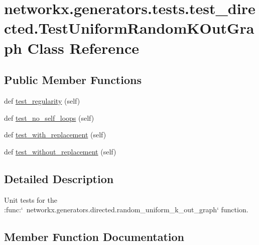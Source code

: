 \hypertarget{classnetworkx_1_1generators_1_1tests_1_1test__directed_1_1TestUniformRandomKOutGraph}{}\section{networkx.\+generators.\+tests.\+test\+\_\+directed.\+Test\+Uniform\+Random\+K\+Out\+Graph Class Reference}
\label{classnetworkx_1_1generators_1_1tests_1_1test__directed_1_1TestUniformRandomKOutGraph}
\subsection*{Public Member Functions}
\begin{DoxyCompactItemize}
\item 
def \hyperlink{classnetworkx_1_1generators_1_1tests_1_1test__directed_1_1TestUniformRandomKOutGraph_a2831bf18c7b74803da2d65ca5dcfa207}{test\+\_\+regularity} (self)
\item 
def \hyperlink{classnetworkx_1_1generators_1_1tests_1_1test__directed_1_1TestUniformRandomKOutGraph_ad8938515e0e710f8faa356b246760646}{test\+\_\+no\+\_\+self\+\_\+loops} (self)
\item 
def \hyperlink{classnetworkx_1_1generators_1_1tests_1_1test__directed_1_1TestUniformRandomKOutGraph_a37ed8e435eef00ef8af10dd46ecb6cb0}{test\+\_\+with\+\_\+replacement} (self)
\item 
def \hyperlink{classnetworkx_1_1generators_1_1tests_1_1test__directed_1_1TestUniformRandomKOutGraph_aff9b5ed5c1b25d9fa09e545879ef8bc3}{test\+\_\+without\+\_\+replacement} (self)
\end{DoxyCompactItemize}


\subsection{Detailed Description}
\begin{DoxyVerb}Unit tests for the
:func:`~networkx.generators.directed.random_uniform_k_out_graph`
function.\end{DoxyVerb}
 

\subsection{Member Function Documentation}
\mbox{\label{classnetworkx_1_1generators_1_1tests_1_1test__directed_1_1TestUniformRandomKOutGraph_ad8938515e0e710f8faa356b246760646}} 
